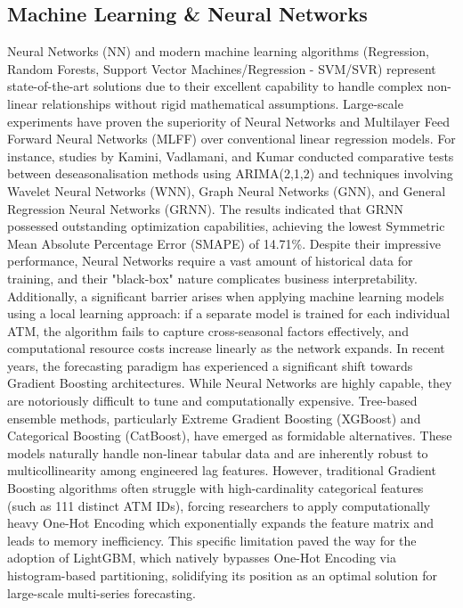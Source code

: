 \documentclass[conference, 12pt, onecolumn]{IEEEtran}
\begin{document}
\subsection{Machine Learning \& Neural Networks}
Neural Networks (NN) and modern machine learning algorithms (Regression, Random Forests, Support Vector Machines/Regression - SVM/SVR) represent state-of-the-art solutions due to their excellent capability to handle complex non-linear relationships without rigid mathematical assumptions. Large-scale experiments have proven the superiority of Neural Networks and Multilayer Feed Forward Neural Networks (MLFF) over conventional linear regression models. For instance, studies by Kamini, Vadlamani, and Kumar conducted comparative tests between deseasonalisation methods using ARIMA(2,1,2) and techniques involving Wavelet Neural Networks (WNN), Graph Neural Networks (GNN), and General Regression Neural Networks (GRNN). The results indicated that GRNN possessed outstanding optimization capabilities, achieving the lowest Symmetric Mean Absolute Percentage Error (SMAPE) of 14.71\%. Despite their impressive performance, Neural Networks require a vast amount of historical data for training, and their "black-box" nature complicates business interpretability. Additionally, a significant barrier arises when applying machine learning models using a local learning approach: if a separate model is trained for each individual ATM, the algorithm fails to capture cross-seasonal factors effectively, and computational resource costs increase linearly as the network expands. In recent years, the forecasting paradigm has experienced a significant shift towards Gradient Boosting architectures. While Neural Networks are highly capable, they are notoriously difficult to tune and computationally expensive. Tree-based ensemble methods, particularly Extreme Gradient Boosting (XGBoost) and Categorical Boosting (CatBoost), have emerged as formidable alternatives. These models naturally handle non-linear tabular data and are inherently robust to multicollinearity among engineered lag features. However, traditional Gradient Boosting algorithms often struggle with high-cardinality categorical features (such as 111 distinct ATM IDs), forcing researchers to apply computationally heavy One-Hot Encoding which exponentially expands the feature matrix and leads to memory inefficiency. This specific limitation paved the way for the adoption of LightGBM, which natively bypasses One-Hot Encoding via histogram-based partitioning, solidifying its position as an optimal solution for large-scale multi-series forecasting.
\end{document}
